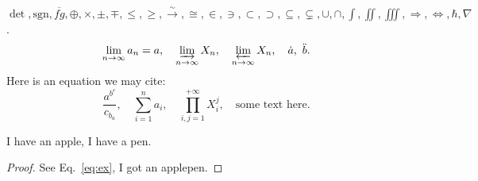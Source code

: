 \documentclass{beamer}
\newcommand{\ra}{\rightarrow}
\newcommand\sto[1]{\stackrel{#1}{\longrightarrow}}
\newcommand\simto{\sto{\sim}}
\newcommand\ov{\overline}
\newcommand\Ra{\Longrightarrow}
\newcommand\LRa{\Longleftrightarrow}
\newcommand\ilim{\varinjlim\limits}
\newcommand\plim{\varprojlim\limits}
\theoremstyle{remark}
\numberwithin{equation}{section}
\begin{document}
\begin{frame}

$\det, \mathrm{sgn}, \ov{fg}, \oplus, \times, \pm, \mp, \le, \ge, \simto, \cong, \in, \ni, \subset, \supset, \subseteq, \subsetneq, \cup,\cap,\int,\iint,\iiint,\Ra,\LRa, \hbar,\nabla$. \pause %
\[
\lim_{n\ra\infty}a_n=a,\quad
\ilim_{n\ra\infty}X_n,\quad
\plim_{n\ra\infty}X_n,\quad
\dot{a},\ \ddot{b}.\]
Here is an equation we may cite:
\begin{equation}\label{eq:ex} %
\frac{a^{b^c}}{c_{b_a}},\quad
\sum_{i=1}^n a_i,\quad
\prod_{i,j=1}^{+\infty} X_i^j,\quad
\text{some text here}.
\end{equation}

\begin{lemma}\label{lem:pen}
I have an apple, I have a pen.
\end{lemma}

\begin{proof}
See Eq.~\eqref{eq:ex}, I got an applepen.
\end{proof}

\end{frame}
\end{document}
